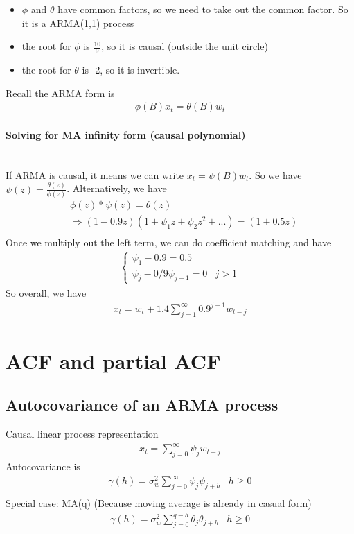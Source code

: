     \begin{itemize}
        \item $\phi$ and $\theta$ have common factors, so we need to take out the common factor. So it is a ARMA(1,1) process
        \item the root for $\phi$ is $\frac{10}{9}$, so it is causal (outside the unit circle) 
        \item the root for $\theta$ is -2, so it is invertible. 
    \end{itemize}
Recall the ARMA form is 
    \begin{align*}
        \phi(B)x_t = \theta(B)w_t
    \end{align*}

\paragraph{Solving for MA infinity form (causal polynomial)}\mbox{}\\    
If ARMA is causal, it means we can write $x_t = \psi(B)w_t$. So we have $\psi(z) = \frac{\theta(z)}{\phi(z)}$. Alternatively, we have  
    \begin{align*}
        & \phi(z) * \psi(z) = \theta(z) \\
        & \Longrightarrow (1-0.9z)(1+\psi_1 z + \psi_2 z^2 + ... ) = (1 + 0.5z)\\
    \end{align*}
Once we multiply out the left term, we can do coefficient matching and have 
    \begin{align*}
        \begin{cases}
            \psi_1 - 0.9 = 0.5 \\
            \psi_j - 0/9 \psi_{j-1} = 0 & j > 1
        \end{cases}
    \end{align*}
So overall, we have 
    \begin{align*}
        x_t = w_t + 1.4 \sum_{j=1}^\infty 0.9^{j-1} w_{t-j}
    \end{align*}


\section{ACF and partial ACF} 

\subsection{Autocovariance of an ARMA process}
Causal linear process representation
    \begin{align*}
        x_t = \sum_{j=0}^\infty \psi_j w_{t-j}
    \end{align*}
Autocovariance is 
    \begin{align*}
        \gamma(h) = \sigma_w^2 \sum_{j=0}^\infty \psi_j \psi_{j+h} & h \geq 0 \\
    \end{align*}
Special case: MA(q) (Because moving average is already in casual form)
    \begin{align*}
        \gamma(h) = \sigma_w^2 \sum_{j=0}^{q-h} \theta_j \theta_{j+h} & h \geq 0
    \end{align*}

